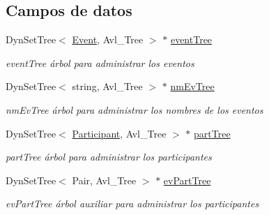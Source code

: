 \subsection*{Campos de datos}
\begin{DoxyCompactItemize}
\item 
Dyn\+Set\+Tree$<$ \hyperlink{class_event}{Event}, Avl\+\_\+\+Tree $>$ $\ast$ \hyperlink{class_sporty_window_ae5042630126b218d12b7f7b9b92c4307}{event\+Tree}\hypertarget{class_sporty_window_ae5042630126b218d12b7f7b9b92c4307}{}\label{class_sporty_window_ae5042630126b218d12b7f7b9b92c4307}

\begin{DoxyCompactList}\small\item\em event\+Tree árbol para administrar los eventos \end{DoxyCompactList}\item 
Dyn\+Set\+Tree$<$ string, Avl\+\_\+\+Tree $>$ $\ast$ \hyperlink{class_sporty_window_a1d1ad05d15c5b535772652e0f72afe04}{nm\+Ev\+Tree}\hypertarget{class_sporty_window_a1d1ad05d15c5b535772652e0f72afe04}{}\label{class_sporty_window_a1d1ad05d15c5b535772652e0f72afe04}

\begin{DoxyCompactList}\small\item\em nm\+Ev\+Tree árbol para administrar los nombres de los eventos \end{DoxyCompactList}\item 
Dyn\+Set\+Tree$<$ \hyperlink{class_participant}{Participant}, Avl\+\_\+\+Tree $>$ $\ast$ \hyperlink{class_sporty_window_affb306650ea3c48ad8ffc219dcc8c0f7}{part\+Tree}\hypertarget{class_sporty_window_affb306650ea3c48ad8ffc219dcc8c0f7}{}\label{class_sporty_window_affb306650ea3c48ad8ffc219dcc8c0f7}

\begin{DoxyCompactList}\small\item\em part\+Tree árbol para administrar los participantes \end{DoxyCompactList}\item 
Dyn\+Set\+Tree$<$ Pair, Avl\+\_\+\+Tree $>$ $\ast$ \hyperlink{class_sporty_window_a042928055a5216651908f3797c1fc6e6}{ev\+Part\+Tree}\hypertarget{class_sporty_window_a042928055a5216651908f3797c1fc6e6}{}\label{class_sporty_window_a042928055a5216651908f3797c1fc6e6}

\begin{DoxyCompactList}\small\item\em ev\+Part\+Tree árbol auxiliar para administrar los participantes \end{DoxyCompactList}\end{DoxyCompactItemize}


